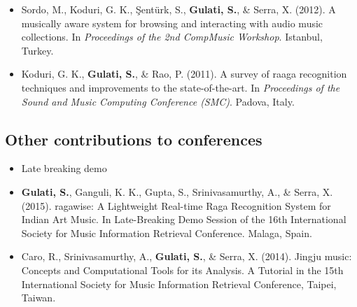 \begin{itemize}[leftmargin=*]
	\item Sordo, M., Koduri, G. K., \c{S}ent{\"u}rk, S., \textbf{Gulati, S.}, \& Serra, X. (2012). A musically aware system for browsing and interacting with audio music collections. In \textit{Proceedings of the 2nd CompMusic Workshop}. Istanbul, Turkey.
	\item Koduri, G. K., \textbf{Gulati, S.}, \& Rao, P. (2011). A survey of raaga recognition techniques and improvements to the state-of-the-art. In \textit{Proceedings of the Sound and Music Computing Conference (SMC)}. Padova, Italy.
\end{itemize}
%
\subsection*{Other contributions to conferences}
\begin{itemize}[leftmargin=*]
	\item Late breaking demo
	\item \textbf{Gulati, S.}, Ganguli, K. K., Gupta, S., Srinivasamurthy, A., \& Serra, X. (2015). \gls{ragawise}: A Lightweight Real-time Raga Recognition System for Indian Art Music. In Late-Breaking Demo Session of the 16th International Society for Music Information Retrieval Conference. Malaga, Spain. 
	\item Caro, R., Srinivasamurthy, A., \textbf{Gulati, S.}, \& Serra, X. (2014). Jingju music: Concepts and Computational Tools for its Analysis. A Tutorial in the 15th International Society for Music Information Retrieval Conference, Taipei, Taiwan. 
	
\end{itemize}
%
%
